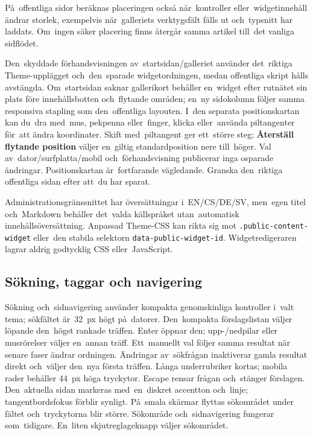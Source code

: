 \documentclass[11pt,a4paper]{article}
\newcommand{\ui}[1]{\textbf{#1}}
\begin{document}
På~offentliga sidor beräknas placeringen också när~kontroller
eller~widgetinnehåll ändrar storlek, exempelvis när~galleriets verktygsfält
fälls ut och~typsnitt har laddats. Om~ingen säker placering finns återgår samma
artikel till~det vanliga sidflödet.

Den~skyddade förhandsvisningen av~startsidan/galleriet använder det~riktiga
Theme-upplägget och~den~sparade widgetordningen, medan offentliga skript hålls
avstängda. Om~startsidan saknar gallerikort behåller en~widget efter rutnätet
sin plats före innehållsbotten och~flytande områden; en~ny sidokolumn följer
samma responsiva stapling som den~offentliga layouten. I~den separata
positionskartan kan du~dra med~mus, pekpenna eller~finger, klicka eller~använda
piltangenter för~att ändra koordinater. Skift med~piltangent ger ett~större
steg; \ui{Återställ flytande position} väljer en~giltig standardposition nere
till~höger. Val av~dator/surfplatta/mobil och~förhandsvisning publicerar inga
osparade ändringar. Positionskartan är~fortfarande vägledande. Granska
den~riktiga offentliga sidan efter att~du har sparat.

Administrationsgränssnittet har översättningar i~EN/CS/DE/SV, men~egen titel
och~Markdown behåller det~valda källspråket utan~automatisk
innehållsöversättning. Anpassad Theme-CSS kan rikta sig mot
\texttt{.public-content-widget} eller~den stabila selektorn
\texttt{data-public-widget-id}. Widgetredigeraren lagrar aldrig godtycklig CSS
eller~JavaScript.


\subsection{Sökning, taggar och navigering}

Sökning och~sidnavigering använder kompakta genomskinliga kontroller
i~valt tema; sökfältet är~32~px högt på~datorer.
Den~kompakta förslagslistan väljer löpande den~högst rankade träffen.
Enter öppnar den; upp-/nedpilar eller musrörelser väljer en~annan träff.
Ett~manuellt val följer samma resultat när senare faser ändrar ordningen.
Ändringar av~sökfrågan inaktiverar gamla resultat direkt och~väljer den~nya
första träffen. Långa underrubriker kortas; mobila rader behåller 44~px
höga tryckytor. Escape rensar frågan och~stänger förslagen.
Den~aktuella sidan markeras med~en~diskret accentton och~linje;
tangentbordsfokus förblir synligt. På~smala skärmar flyttas sökområdet under
fältet och~tryckytorna blir större. Sökområde och~sidnavigering fungerar
som~tidigare. En~liten skjutreglageknapp väljer sökområdet.
\end{document}

